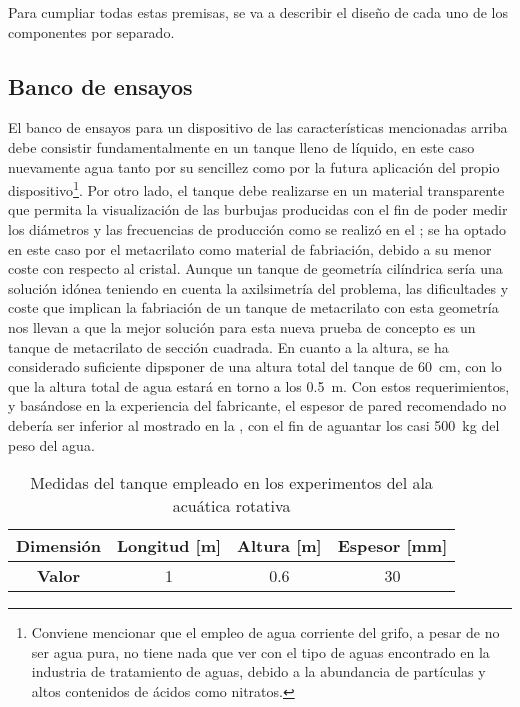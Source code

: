 Para cumpliar todas estas premisas, se va a describir el diseño de cada uno de los componentes por separado. 

 
\subsection{Banco de ensayos}

El banco de ensayos para un dispositivo de las características mencionadas arriba debe consistir fundamentalmente en un tanque lleno de líquido, en este caso nuevamente agua tanto por su sencillez como por la futura aplicación del propio dispositivo\footnote{Conviene mencionar que el empleo de agua corriente del grifo, a pesar de no ser agua pura, no tiene nada que ver con el tipo de aguas encontrado en la industria de tratamiento de aguas, debido a la abundancia de partículas  y altos contenidos de ácidos como nitratos.}. Por otro lado, el tanque debe realizarse en un material transparente que permita la visualización de las burbujas producidas con el fin de poder medir los diámetros y las frecuencias de producción como se realizó en el ; se ha optado en este caso por el metacrilato como material de fabriación, debido a su menor coste con respecto al cristal. Aunque  un tanque de geometría cilíndrica sería una solución idónea teniendo en cuenta la axilsimetría del problema, las dificultades y coste que implican la fabriación de un tanque de metacrilato con esta geometría nos llevan a que la mejor solución para esta nueva prueba de concepto es un tanque de metacrilato de sección cuadrada. En cuanto a la altura, se ha considerado suficiente dipsponer de una altura total del tanque de 60~cm, con lo que la altura total de agua estará en torno a los 0.5~m. Con estos requerimientos, y basándose en la experiencia del fabricante, el espesor de pared recomendado no debería ser inferior al mostrado en la , con el fin de aguantar los casi 500~kg del peso del agua. 

\begin{table}
\centering
\begin{tabular}{cccc}
\textbf{Dimensión} & \textbf{Longitud} [m] & \textbf{Altura} [m] & \textbf{Espesor} [mm] \\
\hline \hline
\textbf{Valor} & 1 & 0.6 & 30 \\
\hline
\end{tabular}
\caption{Medidas del tanque empleado en los experimentos del ala acuática rotativa}
\end{table}


